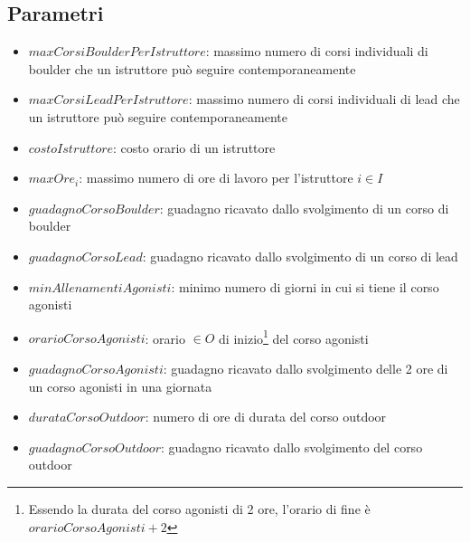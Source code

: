 \subsection{Parametri}
\begin{itemize}
	\item $maxCorsiBoulderPerIstruttore$: massimo numero di corsi individuali di boulder che un istruttore può seguire contemporaneamente
	\item $maxCorsiLeadPerIstruttore$: massimo numero di corsi individuali di lead che un istruttore può seguire contemporaneamente
	\item $costoIstruttore$: costo orario di un istruttore
	\item $maxOre_i$: massimo numero di ore di lavoro per l'istruttore $i \in I$
	\item $guadagnoCorsoBoulder$: guadagno ricavato dallo svolgimento di un corso di boulder
	\item $guadagnoCorsoLead$: guadagno ricavato dallo svolgimento di un corso di lead
	\item $minAllenamentiAgonisti$: minimo numero di giorni in cui si tiene il corso agonisti
	\item $orarioCorsoAgonisti$: orario $\in O$ di inizio\footnote{Essendo la durata del corso agonisti di 2 ore, l'orario di fine è $orarioCorsoAgonisti + 2$} del corso agonisti
	\item $guadagnoCorsoAgonisti$: guadagno ricavato dallo svolgimento delle 2 ore di un corso agonisti in una giornata
	\item $durataCorsoOutdoor$: numero di ore di durata del corso outdoor
	\item $guadagnoCorsoOutdoor$: guadagno ricavato dallo svolgimento del corso outdoor
\end{itemize}

